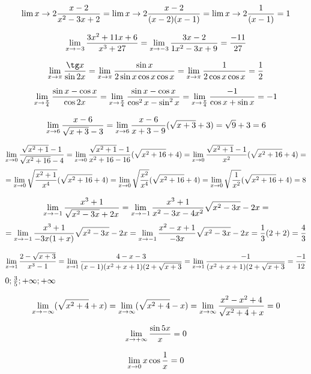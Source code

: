 \Pr
$$
\lim{x\rightarrow2} \frac{x-2}{x^2-3x+2}
=
\lim{x\rightarrow2} \frac{x-2}{(x-2)(x-1)}
=
\lim{x\rightarrow2} \frac{1}{(x-1)}
= 1
$$

$$
\lim_{x\rightarrow -3} \frac{3x^2+11x+6}{x^3+27}
=
\lim_{x\rightarrow -3} \frac{3x-2}{1x^2-3x+9} =\frac{-11}{27}
$$

$$
\lim_{x\r \pi} \f{\tg x}{\sin 2x} 
=
\lim_{x\r \pi} \f{\sin x}{2\sin x \cos x \cos x} 
=
\lim_{x\r \pi} \f{1}{2\cos x \cos x} = \f 12
$$

$$
\lim_{x\rightarrow\frac\pi4} \frac{\sin x-\cos x}{\cos 2x}
=
\lim_{x\rightarrow\frac\pi4} \frac{\sin x-\cos x}{\cos^2 x-\sin^2 x}
=
\lim_{x\rightarrow\frac\pi4} \frac{-1}{\cos x+\sin x}
=
-1
$$

\Pr
$$
\lim_{x\rightarrow6} \frac{x-6}{\sqrt{x+3}-3}
=
\lim_{x\rightarrow6} \frac{x-6}{x+3-9} (\sqrt{x+3}+3)
=
\sqrt{9} + 3
=
6
$$

$$
\lim_{x\rightarrow 0} \frac{\sqrt{x^2+1}-1}{\sqrt{x^2+16}-4}
=
\lim_{x\rightarrow 0} \frac{\sqrt{x^2+1}-1}{x^2+16-16}(\sqrt{x^2+16}+4)
=
\lim_{x\rightarrow 0} \frac{\sqrt{x^2+1}-1}{x^2}(\sqrt{x^2+16}+4)
=$$$$=
\lim_{x\rightarrow 0} \sqrt{\frac{x^2+1}{x^4}}(\sqrt{x^2+16}+4)
=
\lim_{x\rightarrow 0} \sqrt{\frac{x^2}{x^4}}(\sqrt{x^2+16}+4)
=
\lim_{x\rightarrow 0} \sqrt{\frac{1}{x^2}}(\sqrt{x^2+16}+4)
=8
$$

$$
\lim_{x\r -1}\f{x^3+1}{\sqrt{x^2-3x}+2x}
=
\lim_{x\r -1}\f{x^3+1}{x^2-3x-4x^2}\*\sqrt{x^2-3x}-2x
=$$$$=
\lim_{x\r -1}\f{x^3+1}{-3x(1+x)}\*\sqrt{x^2-3x}-2x
=
\lim_{x\r -1}\f{x^2-x+1}{-3x}\*\sqrt{x^2-3x}-2x
=
\f{1}3(2+2)=\f 43
$$

$$
\lim_{x\rightarrow 1} \frac{2-\sqrt{x+3}}{x^3-1}
=
\lim_{x\rightarrow 1} \frac{4-x-3}{(x-1)(x^2+x+1)(2+\sqrt{x+3}}
=
\lim_{x\rightarrow 1} \frac{-1}{(x^2+x+1)(2+\sqrt{x+3}}
=
\frac{-1}{12}
$$
\Pr
$0;\frac 3 5 ; +\infty;+\infty$
\Pr

\Pr
$$
\lim_{x\rightarrow-\infty} (\sqrt{x^2+4}+x)
=
\lim_{x\rightarrow\infty} (\sqrt{x^2+4}-x)
=
\lim_{x\rightarrow\infty} \frac{x^2-x^2+4}{\sqrt{x^2+4}+x}
=0
$$

\Pr
$$\lim_{x\rightarrow+\infty} \frac{\sin 5x}{x} =0$$

$$\lim_{x\rightarrow0} x\cos \frac  1 x = 0$$


\EndDoc
